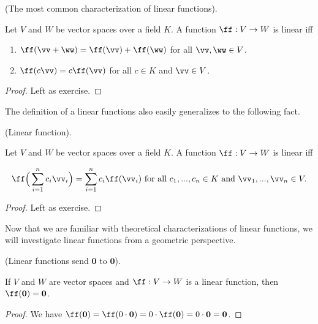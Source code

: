 \begin{theorem}
    (The most common characterization of linear functions).
    
    Let $V$ and $W$ be vector spaces over a field $K$. A function $\ff:V \rightarrow W$ is linear iff
    
    \begin{enumerate}
        \item $\ff(\vv + \ww) = \ff(\vv) + \ff(\ww)$ for all $\vv, \ww \in V$.
        \item $\ff(c\vv) = c\ff(\vv)$ for all $c \in K$ and $\vv \in V$.
    \end{enumerate}
\end{theorem}

\begin{proof}
   Left as exercise.
\end{proof}

The definition of a linear functions also easily generalizes to the following fact.

\begin{theorem}
    (Linear function).
    
    Let $V$ and $W$ be vector spaces over a field $K$. A function $\ff:V \rightarrow W$ is linear iff
    
    \begin{align*}
        \ff \Big(\sum_{i = 1}^n c_i \vv_i \Big) = \sum_{i = 1}^n c_i \ff(\vv_i) \text{ for all } c_1, ..., c_n \in K \text{ and } \vv_1, ..., \vv_n \in V.
    \end{align*}
\end{theorem}

\begin{proof}
    Left as exercise.
\end{proof}

\newpage

Now that we are familiar with theoretical characterizations of linear functions, we will investigate linear functions from a geometric perspective.

\begin{theorem}
    (Linear functions send $\mathbf{0}$ to $\mathbf{0}$).

    If $V$ and $W$ are vector spaces and $\ff:V \rightarrow W$ is a linear function, then $\ff(\mathbf{0}) = \mathbf{0}$.
\end{theorem}

\begin{proof}
    We have $\ff(\mathbf{0}) = \ff(0 \cdot \mathbf{0}) = 0 \cdot \ff(\mathbf{0}) = 0 \cdot \mathbf{0} = \mathbf{0}$.
\end{proof}

